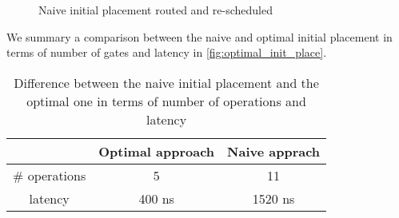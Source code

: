 \begin{figure}[H]
\centering


\label{fig:map_ex_resch}
\caption{Naive initial placement routed and re-scheduled}
\end{figure}
We summary a comparison between the naive and optimal initial placement in terms of number of gates and latency in \ref{fig:optimal_init_place}.


\begin{table}[htbp]
\caption{\label{tab:org3865dee}
Difference between the naive initial placement and the optimal one in terms of number of operations and latency}
\centering
\begin{tabular}{ccc}
\hline
 & Optimal approach & Naive apprach\\
\hline
\# operations & 5 & 11\\
latency & 400 ns & 1520 ns\\
\hline
\end{tabular}
\end{table}

